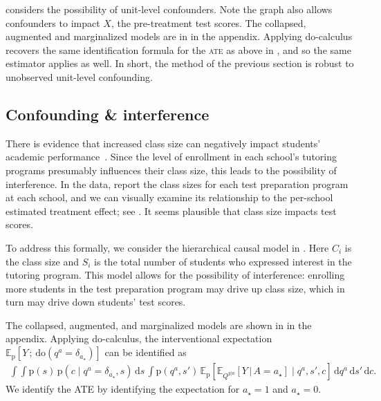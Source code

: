 \documentclass[12pt]{article}
\newcommand{\EE}[2]{\mathbb{E}_{#1}\left[ #2 \right]}
\newcommand{\rmdo}{\mathrm{do}}
\newcommand{\s}{\, ; \,}
\newcommand{\g}{\,\vert\,}
\newcommand{\di}{\mathrm{d}}
\newcommand{\pr}{\mathrm{p}}
\begin{document}
 considers the possibility of unit-level
confounders. Note the graph also allows confounders to impact $X$, the
pre-treatment test scores. The collapsed, augmented and marginalized
models are in  in the appendix. Applying do-calculus recovers the same identification
formula for the \textsc{ate} as above in , and
so the same estimator applies as well. In short, the method of the
previous section is robust to unobserved unit-level confounding.

\subsection{Confounding \& interference}
\label{sec:schools_interfere}

There is evidence that increased class size can negatively impact
students' academic performance~\citep[e.g.][]{Angrist1999-hm}. Since
the level of enrollment in each school's tutoring programs presumably
influences their class size, this leads to the possibility of
interference. In the data, \citet{Alderman1979-on} report the class
sizes for each test preparation program at each school, and we can
visually examine its relationship to the per-school estimated
treatment effect; see . It
seems plausible that class size impacts test scores.

To address this formally, we consider the hierarchical causal model in
. Here $C_i$ is the class size and
$S_i$ is the total number of students who expressed interest in the
tutoring program. This model allows for the possibility of
interference: enrolling more students in the test preparation program
may drive up class size, which in turn may drive down students' test
scores.

The collapsed, augmented, and marginalized models are shown in
 in the appendix. Applying do-calculus, the
interventional expectation
$\EE{\pr}{Y \s \rmdo(q^{a} = \delta_{a_\star})}$ can be identified as
\begin{align}
  \label{eqn:schools_interfere_id}
  \int \int
  \pr(s) \,
  \pr(c \mid q^{a} = \delta_{a_\star}, s) \,
  \di s \,
  \int
  \pr({q}^{a}, s') \,
  \EE{\pr}{\EE{Q^{y|a}}{Y \g A = a_\star} \mid {q}^{a}, s', c} \,
  \di {q}^{a} \,
  \di s' \,
  \di c.
\end{align}
We identify the ATE by identifying the expectation for $a_\star = 1$
and $a_\star = 0$.
\end{document}
